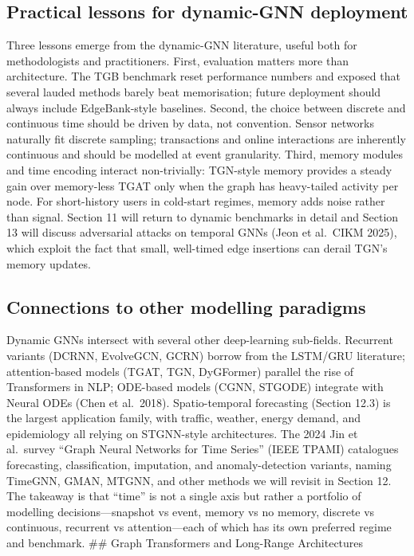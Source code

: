 \subsection{Practical lessons for dynamic-GNN deployment}\label{practical-lessons-for-dynamic-gnn-deployment}

Three lessons emerge from the dynamic-GNN literature, useful both for methodologists and practitioners. First, evaluation matters more than architecture. The TGB benchmark reset performance numbers and exposed that several lauded methods barely beat memorisation; future deployment should always include EdgeBank-style baselines. Second, the choice between discrete and continuous time should be driven by data, not convention. Sensor networks naturally fit discrete sampling; transactions and online interactions are inherently continuous and should be modelled at event granularity. Third, memory modules and time encoding interact non-trivially: TGN-style memory provides a steady gain over memory-less TGAT only when the graph has heavy-tailed activity per node. For short-history users in cold-start regimes, memory adds noise rather than signal. Section 11 will return to dynamic benchmarks in detail and Section 13 will discuss adversarial attacks on temporal GNNs (Jeon et al.~CIKM 2025), which exploit the fact that small, well-timed edge insertions can derail TGN's memory updates.

\subsection{Connections to other modelling paradigms}\label{connections-to-other-modelling-paradigms}

Dynamic GNNs intersect with several other deep-learning sub-fields. Recurrent variants (DCRNN, EvolveGCN, GCRN) borrow from the LSTM/GRU literature; attention-based models (TGAT, TGN, DyGFormer) parallel the rise of Transformers in NLP; ODE-based models (CGNN, STGODE) integrate with Neural ODEs (Chen et al.~2018). Spatio-temporal forecasting (Section 12.3) is the largest application family, with traffic, weather, energy demand, and epidemiology all relying on STGNN-style architectures. The 2024 Jin et al.~survey ``Graph Neural Networks for Time Series'' (IEEE TPAMI) catalogues forecasting, classification, imputation, and anomaly-detection variants, naming TimeGNN, GMAN, MTGNN, and other methods we will revisit in Section 12. The takeaway is that ``time'' is not a single axis but rather a portfolio of modelling decisions---snapshot vs event, memory vs no memory, discrete vs continuous, recurrent vs attention---each of which has its own preferred regime and benchmark.
\#\# Graph Transformers and Long-Range Architectures

